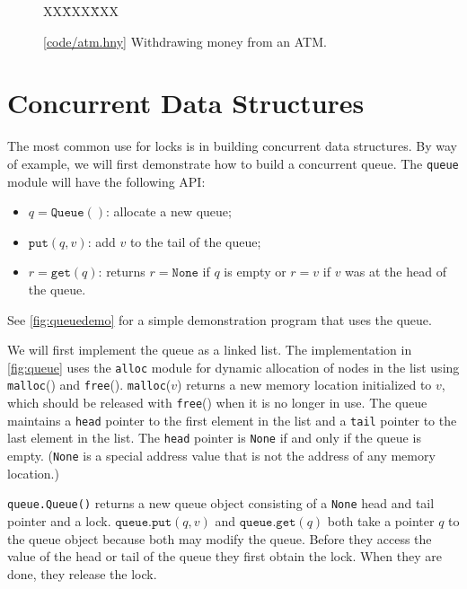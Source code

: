\documentclass{report}
\newcommand{\harmonysource}[1]{
\begin{tabbing}
XX\=XXX\=XXX\kill
    
\end{tabbing}
}
\newcommand{\harmonylink}[1]{%
[\href{https://harmony.cs.cornell.edu/#1}{\underline{#1}}]%
}
\newenvironment{code}{
\tcolorbox
}{
\endtcolorbox
}
\begin{document}
\begin{figure}
\begin{code}
\harmonysource{atm}
\end{code}
\caption{\harmonylink{code/atm.hny} Withdrawing money from an ATM.}
\label{fig:atm}
\end{figure}

\chapter{Concurrent Data Structures}
\label{ch:cds}

The most common use for locks is in building concurrent data structures.
By way of example, we will first demonstrate how to build a concurrent queue.
The \texttt{queue} module will have the following API:
\begin{itemize}
\item $q = \mathtt{Queue}()$: allocate a new queue;
\item $\mathtt{put}(q, v)$: add $v$ to the tail of the queue;
\item $r = \mathtt{get}(q)$: returns $r = \mathtt{None}$
if $q$ is empty or $r = v$ if $v$ was at the head of the queue.
\end{itemize}

\noindent
See \autoref{fig:queuedemo} for a simple demonstration program that uses the queue.

We will first implement the queue as a linked list.
The implementation in \autoref{fig:queue}
uses the \texttt{alloc} module for dynamic allocation
%
of nodes in the list using \texttt{malloc}() and \texttt{free}().
\texttt{malloc}($v$) returns a new memory location initialized to $v$,
which should be released with \texttt{free}() when it is no longer in use.
The queue maintains a \texttt{head} pointer to the first element in the list
and a \texttt{tail} pointer to the last element in the list.
The \texttt{head} pointer is \texttt{None} if and only if the queue is empty.
(\texttt{None} is a special address value that is not the address of any
memory location.)

\texttt{queue.Queue()} returns a new queue object consisting of a \texttt{None} head
and tail pointer and a lock.
$\mathtt{queue.put}(q, v)$ and $\mathtt{queue.get}(q)$ both take a pointer $q$ to the
queue object because both may modify the queue.
Before they access the value of the head or tail of the queue they first obtain
the lock.
When they are done, they release the lock.
\end{document}
